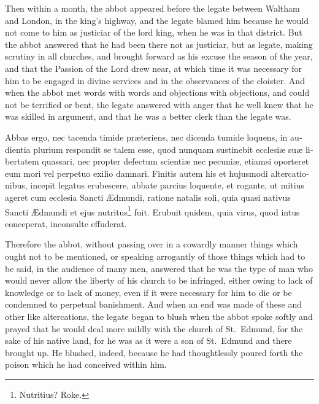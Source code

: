 \documentclass{book}
\begin{document}
\begin{paracol}{2}
\switchcolumn

Then within a month, the abbot appeared before the legate between Waltham and London, in the king's highway, and the legate blamed him because he would not come to him as justiciar of the lord king, when he was in that district. But the abbot answered that he had been there not as justiciar, but as legate, making scrutiny in all churches, and brought forward as his excuse the season of the year, and that the Passion of the Lord drew near, at which time it was necessary for him to be engaged in divine services and in the observances of the cloister. And when the abbot met words with words and objections with objections, and could not be terrified or bent, the legate answered with anger that he well knew that he was skilled in argument, and that he was a better clerk than the legate was.

\switchcolumn*

\begin{otherlanguage}{latin}
Abbas ergo, nec tacenda timide pr\ae{}teriens, nec dicenda tumide loquens, in audientia plurium respondit se talem esse, quod nunquam sustinebit ecclesi\ae{} su\ae{} libertatem quassari, nec propter defectum scienti\ae{} nec pecuni\ae{}, etiamsi oporteret eum mori vel perpetuo exilio damnari. Finitis autem his et hujusmodi altercationibus, incepit legatus erubescere, abbate parcius loquente, et rogante, ut mitius ageret cum ecclesia Sancti \AE{}dmundi, ratione natalis soli, quia quasi nativus Sancti \AE{}dmundi et ejus nutritus\footnote[\textdagger]{Nutritius? Roke.} fuit. Erubuit quidem, quia virus, quod intus conceperat, inconsulte effuderat.
\end{otherlanguage}

\switchcolumn

Therefore the abbot, without passing over in a cowardly manner things which ought not to be mentioned, or speaking arrogantly of those things which had to be said, in the audience of many men, answered that he was the type of man who would never allow the liberty of his church to be infringed, either owing to lack of knowledge or to lack of money, even if it were necessary for him to die or be condemned to perpetual banishment. And when an end was made of these and other like altercations, the legate began to blush when the abbot spoke softly and prayed that he would deal more mildly with the church of St.\ Edmund, for the sake of his native land, for he was as it were a son of St.\ Edmund and there brought up. He blushed, indeed, because he had thoughtlessly poured forth the poison which he had conceived within him.


\end{paracol}
\end{document}

